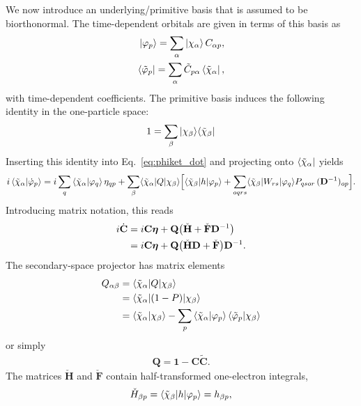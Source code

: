 \documentclass[aip,jcp,preprint,superscriptaddress,nofootinbib]{revtex4-1}
\begin{document}
We now introduce an underlying/primitive basis that is assumed to be biorthonormal.
The time-dependent orbitals are given in terms of this basis as
\begin{align}
    \ket{\varphi_{p}} = \sum_{\alpha} \ket{\chi_{\alpha}} C_{\alpha p},         \label{eq:phi_ket_expansion} \\
    \bra{\tilde{\varphi}_{p}} = \sum_{\alpha} \tilde{C}_{p \alpha} \bra{\tilde{\chi}_{\alpha}}, \label{eq:phi_bra_expansion}
\end{align}
with time-dependent coefficients. The primitive basis induces the following identity in
the one-particle space:
\begin{align}
    1 = \sum_{\beta} \ket{\chi_{\beta}} \! \bra{\tilde{\chi}_{\beta}} 
\end{align}
Inserting this identity into Eq.~\eqref{eq:phiket_dot} and projecting onto $\bra{\tilde{\chi}_{\alpha}}$ yields
\begin{multline}
    i \braket{\tilde{\chi}_{\alpha} | \dot{\varphi}_{p}} 
    = i \sum_{q} \braket{\tilde{\chi}_{\alpha} | \varphi_{q}} \eta_{qp}
    + \sum_{\beta} \langle \tilde{\chi}_{\alpha} \vert Q \vert \chi_{\beta} \rangle \Big[
    \langle \tilde{\chi}_{\beta} \vert h \vert \varphi_{p} \rangle
    + \sum_{oqrs}  \langle \tilde{\chi}_{\beta} \vert W_{rs} \vert \varphi_{q} \rangle P_{qsor} \, (\mathbf{D}^{-1})_{op}
    \Big].
\end{multline}
Introducing matrix notation, this reads
\begin{align} \label{eq:C_dot}
    i \dot{\mathbf{C}} 
    &= i \mathbf{C} \bm{\eta} + 
    \mathbf{Q}  \big( \check{\mathbf{H}} + \check{\mathbf{F}} \mathbf{D}^{-1} \big) \nonumber\\
    &= i \mathbf{C} \bm{\eta} + 
    \mathbf{Q}  \big( \check{\mathbf{H}} \mathbf{D} + \check{\mathbf{F}} \big) \mathbf{D}^{-1} .
\end{align}
The secondary-space projector has matrix elements
\begin{align}
    Q_{\alpha \beta} 
    &= \langle \tilde{\chi}_{\alpha} \vert Q \vert \chi_{\beta} \rangle \nonumber\\
    &= \langle \tilde{\chi}_{\alpha} \vert (1 - P) \vert \chi_{\beta} \rangle \nonumber\\
    &= \braket{\tilde{\chi}_{\alpha} | \chi_{\beta}} - \sum_{p} \braket{\tilde{\chi}_{\alpha} | \varphi_{p}} \braket{\tilde{\varphi}_{p} | \chi_{\beta}}
\end{align}
or simply
\begin{align}
    \mathbf{Q} = \mathbf{1} - \mathbf{C} \tilde{\mathbf{C}}.
\end{align}
The matrices $\check{\mathbf{H}}$ and $\check{\mathbf{F}}$ contain
half-transformed one-electron integrals,
\begin{gather}
    \check{H}_{\beta p} = \langle \tilde{\chi}_{\beta} \vert h \vert \varphi_{p} \rangle = h_{\beta p},
\end{gather}
\end{document}
